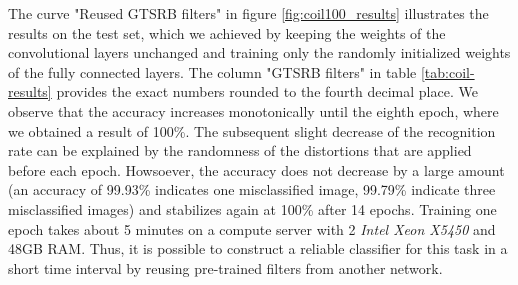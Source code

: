 \documentclass[11pt, a4paper]{article}
\begin{document}
The curve "Reused GTSRB filters" in figure \ref{fig:coil100_results} illustrates the results on the test set, which we achieved by keeping the weights of the convolutional layers unchanged and training only the randomly initialized weights of the fully connected layers. The column "GTSRB filters" in table \ref{tab:coil-results} provides the exact numbers rounded to the fourth decimal place. We observe that the accuracy increases monotonically until the eighth epoch, where we obtained a result of 100\%. The subsequent slight decrease of the recognition rate can be explained by the randomness of the distortions that are applied before each epoch. Howsoever, the accuracy does not decrease by a large amount (an accuracy of 99.93\% indicates one misclassified image, 99.79\% indicate three misclassified images) and stabilizes again at 100\% after 14 epochs. Training one epoch takes about 5 minutes on a compute server with 2 \emph{Intel Xeon X5450} and 48GB RAM. Thus, it is possible to construct a reliable classifier for this task in a short time interval by reusing pre-trained filters from another network.
\end{document}
